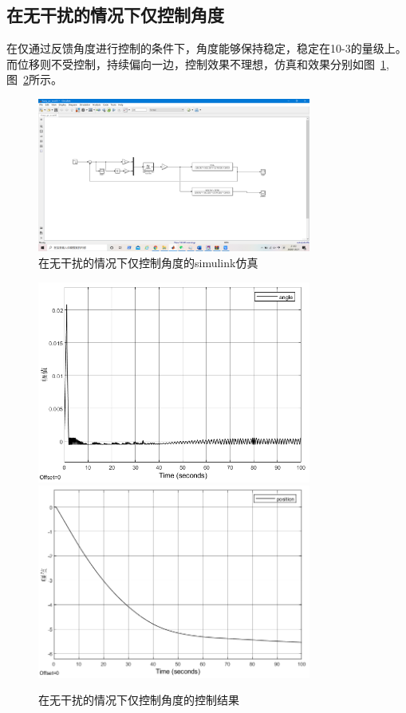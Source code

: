 \subsection{在无干扰的情况下仅控制角度}
在仅通过反馈角度进行控制的条件下，角度能够保持稳定，稳定在10-3的量级上。而位移则不受控制，持续偏向一边，控制效果不理想，仿真和效果分别如图~\ref{fig:onlyanglesim},图~\ref{fig:onlyangle}所示。
\begin{figure}[hbpt]
\centering
\includegraphics[width=9cm]{onlyangle1.png}
\caption{在无干扰的情况下仅控制角度的simulink仿真}\label{fig:onlyanglesim}
\end{figure}

\begin{figure}[hbpt]
\centering
\includegraphics[width=9cm]{onlyangle2.png}
\includegraphics[width=9cm]{onlyangle3.png}
\caption{在无干扰的情况下仅控制角度的控制结果}\label{fig:onlyangle}
\end{figure}

